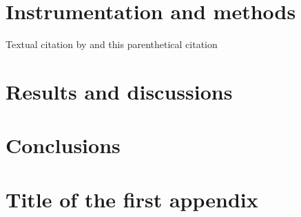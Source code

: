 \documentclass[b5paper,12pt]{book} %
\begin{document}
\chapter{Instrumentation and  methods}

\lipsum[1-3]

Textual citation by \citet{Gries09} and this parenthetical citation \citep{Van-Dongen12}

\chapter{Results and discussions}

\lipsum[1-3]

\chapter{Conclusions}

\lipsum[1-3]

\appendix
\renewcommand{\chaptermark}[1]{\markboth{\small Appendix \thechapter. #1}{}}

\chapter{Title of the first appendix} \label{app:freq}

\backmatter

\end{document}
